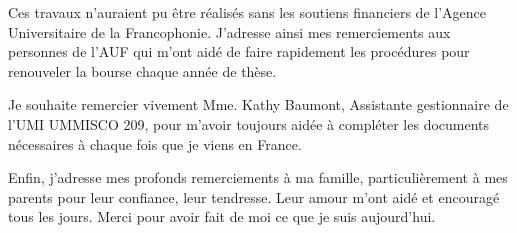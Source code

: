 Ces travaux n'auraient pu être réalisés sans les soutiens financiers de l'Agence Universitaire de la Francophonie. J'adresse ainsi mes remerciements aux personnes de l'AUF qui m'ont aidé de faire rapidement les procédures pour renouveler la bourse chaque année de thèse.

Je souhaite remercier vivement Mme. Kathy Baumont, Assistante gestionnaire de l'UMI UMMISCO 209, pour m'avoir toujours aidée à compléter les documents nécessaires à chaque fois que je viens en France.



Enfin, j'adresse mes profonds remerciements à ma famille, particulièrement à mes parents pour leur confiance, leur tendresse. Leur amour m'ont aidé et encouragé tous les jours. Merci pour avoir fait de moi ce que je suis aujourd'hui.

%
%
%
%
%
%
%
%
%
%
